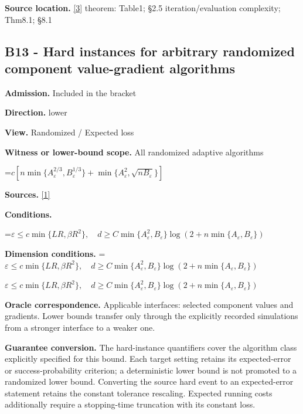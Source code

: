 \documentclass[10pt,a4paper]{article}
\newcommand{\AtlasMath}[1]{\par\begingroup\centering\setbox0=\hbox{$\displaystyle #1$}\ifdim\wd0>1.4\linewidth\typeout{ATLAS WIDE FORMULA: \the\wd0}\fi\ifdim\wd0>\linewidth\resizebox{\linewidth}{!}{\box0}\else\box0\fi\par\endgroup}
\newcommand{\AtlasInlineMath}[1]{\begingroup\setbox0=\hbox{$#1$}\ifdim\wd0>.4\linewidth\endgroup\AtlasMath{#1}\else\endgroup$#1$\fi}
\begin{document}
\textbf{Source location.} \href{https://arxiv.org/pdf/2311.10886}{[3]} theorem: Table1; §2.5 iteration/evaluation complexity; Thm8.1; §8.1



\subsection{B13 - Hard instances for arbitrary randomized component value-gradient algorithms}


\textbf{Admission.} Included in the bracket



\textbf{Direction.} lower



\textbf{View.} Randomized / Expected loss



\textbf{Witness or lower-bound scope.} All randomized adaptive algorithms



\AtlasMath{c[n\min\{A_\varepsilon^{2/3},B_\varepsilon^{1/3}\}+\min\{A_\varepsilon^2,\sqrt{nB_\varepsilon}\}]}


\textbf{Sources.} \href{https://arxiv.org/pdf/2105.01778}{[1]}



\textbf{Conditions.}
\AtlasMath{\varepsilon\le c\min\{LR,\beta R^2\},\quad d\ge C\min\{A_\varepsilon^2,B_\varepsilon\}\log(2+n\min\{A_\varepsilon,B_\varepsilon\})}




\textbf{Dimension conditions.} \AtlasInlineMath{\varepsilon\le c\min\{LR,\beta R^2\},\quad d\ge C\min\{A_\varepsilon^2,B_\varepsilon\}\log(2+n\min\{A_\varepsilon,B_\varepsilon\})}



\textbf{Oracle correspondence.} Applicable interfaces: selected component values and gradients. Lower bounds transfer only through the explicitly recorded simulations from a stronger interface to a weaker one.



\textbf{Guarantee conversion.} The hard-instance quantifiers cover the algorithm class explicitly specified for this bound. Each target setting retains its expected-error or success-probability criterion; a deterministic lower bound is not promoted to a randomized lower bound. Converting the source hard event to an expected-error statement retains the constant tolerance rescaling. Expected running costs additionally require a stopping-time truncation with its constant loss.
\end{document}
